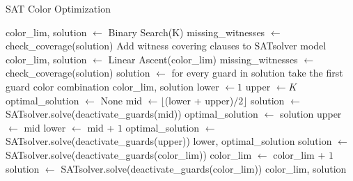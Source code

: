 \begin{algorithm}
\caption{SAT Color Optimization}\label{alg:SAT_color_opt}
\fontsize{10}{12}\selectfont
\begin{algorithmic}[1]
    \State color\_lim, solution $\gets$ Binary Search(K)
    \State missing\_witnesses $\gets$ check\_coverage(solution)
            \State Add witness covering clauses to SATsolver model
        \EndFor
        \State color\_lim, solution $\gets$ Linear Ascent(color\_lim)
        \State missing\_witnesses $\gets$ check\_coverage(solution)
    \EndWhile
    \State solution $\gets$ for every guard in solution take the first guard color combination
    \State \Return color\_lim, solution
\EndProcedure
{}
    \State lower $\gets 1$
    \State upper $\gets K$
    \State optimal\_solution $\gets$ None
        \State mid $\gets \lfloor$(lower + upper)$/2\rfloor$
        \State solution $\gets$ SATsolver.solve(deactivate\_guards(mid))
            \State optimal\_solution $\gets$ solution
            \State upper $\gets$ mid
        \Else
            \State lower $\gets$ mid + $1$
        \EndIf
    \EndWhile
        \State optimal\_solution $\gets$ SATsolver.solve(deactivate\_guards(upper))
    \EndIf
    \State \Return lower, optimal\_solution
\EndProcedure
{}
    \State solution $\gets$ SATsolver.solve(deactivate\_guards(color\_lim))
        \State color\_lim $\gets$ color\_lim + $1$
        \State solution $\gets$ SATsolver.solve(deactivate\_guards(color\_lim))
    \EndWhile
    \State \Return color\_lim, solution
\EndProcedure
\end{algorithmic}
\end{algorithm}

